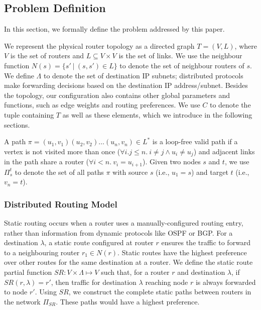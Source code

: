 \subsection{Problem Definition}
In this section, we formally define the problem addressed by this paper.

We represent the physical router topology as a directed graph $T=(V, L)$,
where $V$ is the set of routers and $L\subseteq V\times V$ is the set of links. 
We use the neighbour function $N(s) = \{s'\ | \ (s,s') \in L \}$ to denote 
the set of neighbour routers of $s$. 
We define $\Lambda$ to denote the set of destination IP subnets;
distributed protocols make forwarding decisions based on the 
destination IP address/subnet.
Besides the topology, our configuration also contains other global parameters and functions, such as edge
weights and routing preferences. 
We use $C$ to denote the tuple containing $T$ as well as these elements, which we introduce in the following sections.

A path $\pi = (u_1,v_1) (u_2, v_2) \ldots (u_n, v_n) \in L^*$ is a loop-free valid path if
a  vertex is not visited more than once ($\forall i.j \leq n. 
~i \not= j \wedge u_i \not= u_j$) and adjacent links in the
path share a router ($\forall i < n. ~v_i = u_{i+1}$).
Given two nodes $s$ and $t$, we use $\Pi_s^t$ to denote the set of all paths
$\pi$ with source $s$ (i.e., $u_1=s$) and target $t$ (i.e., $v_n=t$).


\subsubsection{Distributed Routing Model}
Static routing occurs when a router uses a 
manually-configured routing entry, 
rather than information from dynamic protocols like
OSPF or BGP.  
For a destination $\lambda$, a static route configured
at router $r$ ensures the traffic to forward to a 
neighbouring router $r_1 \in N(r)$. 
Static routes have the highest
preference over other routes for the same destination
at a router. We define the static route
partial function $SR: V \times \Lambda \mapsto V$  such
that, for a router $r$ and destination $\lambda$, if $SR(r,\lambda)=r'$, 
then traffic for destination $\lambda$ reaching node $r$ is always
forwarded to node $r'$. 
Using $SR$, we construct the complete
static paths between routers in the network $\Pi_{SR}$. These 
paths would have a highest preference. 

